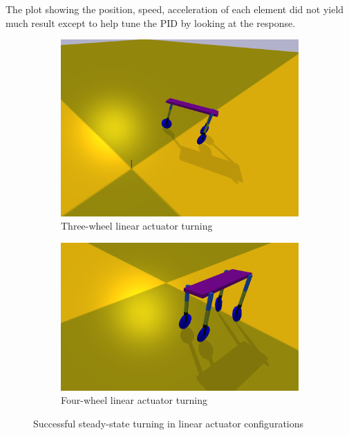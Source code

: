 The plot showing the position, speed, acceleration of each element did not yield much result except to help tune the PID by looking at the response.
\begin{figure}[h!]
    \centering
    \begin{subfigure}[b]{0.48\linewidth}
        \includegraphics[width=\linewidth]{Figures/ch8_ThreeWheelLinearTurning.png}
        \caption{Three-wheel linear actuator turning}
        \label{fig:linear_success_turn}
    \end{subfigure}
    \hfill
    \begin{subfigure}[b]{0.48\linewidth}
        \includegraphics[width=\linewidth]{Figures/ch8_FourWheelSuccessfullTurn.png}
        \caption{Four-wheel linear actuator turning}
        \label{fig:fourwheel_success}
    \end{subfigure}
    \caption{Successful steady-state turning in linear actuator configurations}
\end{figure}

